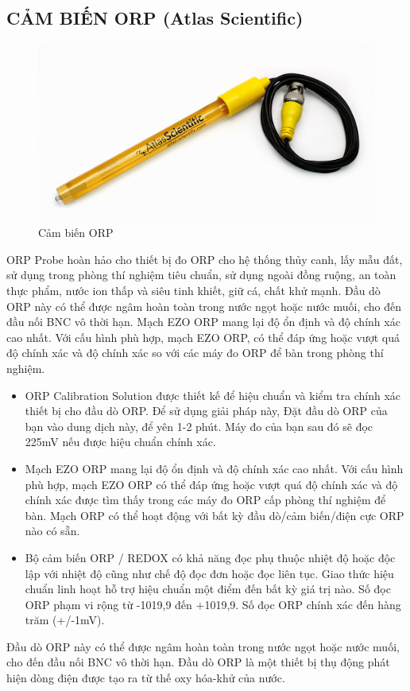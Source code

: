 \subsection{CẢM BIẾN ORP (Atlas Scientific)}
\begin{figure}[H]
	\centering
	\includegraphics[scale=.3]{Chapter 3/image chapter 3/ORPSensor.png}
	\caption[Cảm biến ORP]{Cảm biến ORP}
\end{figure}
ORP Probe hoàn hảo cho thiết bị đo ORP cho hệ thống thủy canh, lấy mẫu đất, sử dụng trong phòng thí nghiệm tiêu chuẩn, sử dụng ngoài đồng ruộng, an toàn thực phẩm, nước ion thấp và siêu tinh khiết, giữ cá, chất khử mạnh. Đầu dò ORP này có thể được ngâm hoàn toàn trong nước ngọt hoặc nước muối, cho đến đầu nối BNC vô thời hạn. Mạch EZO ORP mang lại độ ổn định và độ chính xác cao nhất. Với cấu hình phù hợp, mạch EZO ORP, có thể đáp ứng hoặc vượt quá độ chính xác và độ chính xác so với các máy đo ORP để bàn trong phòng thí nghiệm.
\begin{itemize}
	\item ORP Calibration Solution được thiết kế để hiệu chuẩn và kiểm tra chính xác thiết bị cho đầu dò ORP. Để sử dụng giải pháp này, Đặt đầu dò ORP của bạn vào dung dịch này, để yên 1-2 phút. Máy đo của bạn sau đó sẽ đọc 225mV nếu được hiệu chuẩn chính xác.
	\item Mạch EZO ORP mang lại độ ổn định và độ chính xác cao nhất. Với cấu hình phù hợp, mạch EZO ORP có thể đáp ứng hoặc vượt quá độ chính xác và độ chính xác được tìm thấy trong các máy đo ORP cấp phòng thí nghiệm để bàn. Mạch ORP có thể hoạt động với bất kỳ đầu dò/cảm biến/điện cực ORP nào có sẵn.
	\item Bộ cảm biến ORP / REDOX có khả năng đọc phụ thuộc nhiệt độ hoặc độc lập với nhiệt độ cũng như chế độ đọc đơn hoặc đọc liên tục. Giao thức hiệu chuẩn linh hoạt hỗ trợ hiệu chuẩn một điểm đến bất kỳ giá trị nào. Số đọc ORP phạm vi rộng từ -1019,9 đến +1019,9. Số đọc ORP chính xác đến hàng trăm (+/-1mV).
\end{itemize}

\indent Đầu dò ORP này có thể được ngâm hoàn toàn trong nước ngọt hoặc nước muối, cho đến đầu nối BNC vô thời hạn. Đầu dò ORP là một thiết bị thụ động phát hiện dòng điện được tạo ra từ thế oxy hóa-khử của nước.